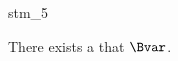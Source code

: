 \documentclass{stex}
\begin{document}
\begin{smodule}{stm_5}
  
  \begin{sassertion}[id=stm-5]
    There exists a  that  $\Bvar$.
  \end{sassertion}
\end{smodule}
\end{document}
